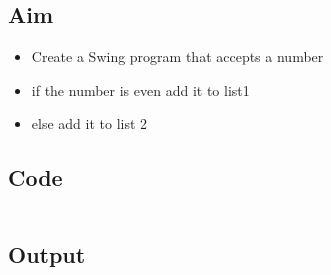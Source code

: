 \documentclass[../main.tex]{subfiles}
\begin{document}
\subsection{Aim}
\begin{itemize}
	\item Create a Swing program that accepts a number
	\item if the number is even add it to list1
	\item else add it to list 2
\end{itemize}

\subsection{Code}
\inputminted[frame=lines, breaklines, breakanywhere, numberblanklines=false]{java}{./programs/prog12/Swing.java}

\subsection{Output}
\end{document}

